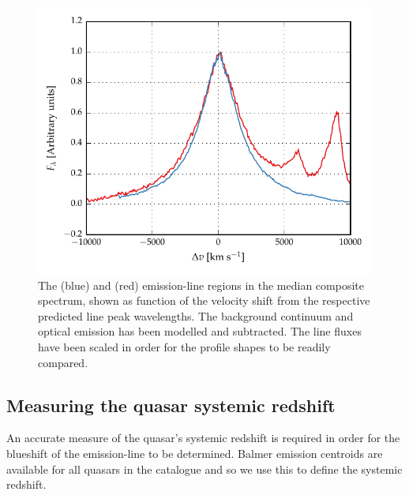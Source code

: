 \begin{figure}
    \centering 
    \includegraphics[width=0.8\linewidth]{figures/chapter03/ha_hb_composite.pdf} 
    \caption[{The \ha (blue) and \hb (red) emission-line regions in the median composite spectrum, shown as function of the velocity shift from the respective predicted line peak wavelengths.}]{The \ha (blue) and \hb (red) emission-line regions in the median composite spectrum, shown as function of the velocity shift from the respective predicted line peak wavelengths. The background continuum and optical  emission has been modelled and subtracted. The line fluxes have been scaled in order for the profile shapes to be readily compared.}
    \label{fig:balmer_composite}
\end{figure}


\subsection{Measuring the quasar systemic redshift}
\label{sec:zsys}

An accurate measure of the quasar's systemic redshift is required in order for the blueshift of the  emission-line to be determined.
Balmer emission centroids are available for all quasars in the catalogue and so we use this to define the systemic redshift.


